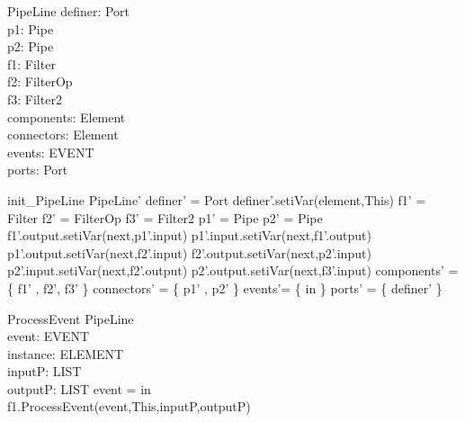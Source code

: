 \begin{schema}{PipeLine}
definer: Port \\
p1:  Pipe \\
p2:  Pipe \\
f1: Filter \\
f2: FilterOp \\
f3: Filter2 \\
components: \pset Element \\
connectors: \pset Element \\
events: \pset EVENT \\
ports: \pset Port 
\end{schema}


\begin{zed}
init\_PipeLine \sdef \lsch PipeLine' \bbar definer' = \new Port \land definer'.setiVar(element,This) \land f1' = \new Filter   \land f2' = \new FilterOp \land f3' = \new Filter2 \land p1' = \new Pipe \land p2' = \new Pipe \land f1'.output.setiVar(next,p1'.input) \land p1'.input.setiVar(next,f1'.output) \land p1'.output.setiVar(next,f2'.input) \land f2'.output.setiVar(next,p2'.input) \land p2'.input.setiVar(next,f2'.output) \land  p2'.output.setiVar(next,f3'.input) \land components' = \{  f1' , f2', f3' \} \land connectors' = \{ p1' , p2'  \}  \land events'= \{ in \} \land ports' = \{  definer'  \} \rsch  \end{zed}

\begin{schema}{ProcessEvent}
\Delta PipeLine \\
event: EVENT \\
instance: ELEMENT \\
inputP: LIST \\
outputP: LIST 
\where event = in \\
f1.ProcessEvent(event,This,inputP,outputP)
\end{schema}


